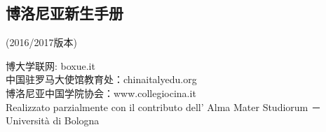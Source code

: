 
\begin{titlepage}                  
% 


\topmargin=-2cm   
\chapter*{博洛尼亚新生手册}                 %
\pagestyle{empty}%
\thispagestyle{empty} 
	\begin{center}
	(2016/2017版本)
	\end{center}



\vspace*{12cm}
\begin{center}
博大学联网: boxue.it\\
中国驻罗马大使馆教育处：chinaitalyedu.org\\
博洛尼亚中国学院协会：www.collegiocina.it\\
Realizzato parzialmente con il contributo dell'
Alma Mater Studiorum － Universit\`a di Bologna
\end{center}


\end{titlepage}
